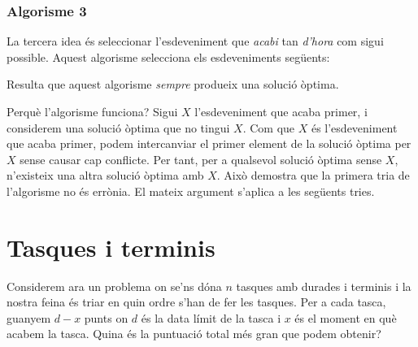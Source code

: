 \subsubsection*{Algorisme 3}

La tercera idea és seleccionar l'esdeveniment que
\emph{acabi} tan \emph{d'hora} com sigui possible.
Aquest algorisme selecciona els esdeveniments següents:
\begin{center}
\end{center}

Resulta que aquest algorisme
\emph{sempre} produeix una solució òptima.

Perquè l'algorisme funciona?  Sigui $X$ l'esdeveniment que acaba
primer, i considerem una solució òptima que no tingui $X$. Com
que $X$ és l'esdeveniment que acaba primer, podem intercanviar
el primer element de la solució òptima per $X$ sense
causar cap conflicte. Per tant, per a qualsevol solució òptima
sense $X$, n'existeix una altra solució òptima amb $X$. Això demostra
que la primera tria de l'algorisme no és errònia. El mateix argument
s'aplica a les següents tries.

\section{Tasques i terminis}

Considerem ara un problema on
se'ns dóna $n$ tasques amb durades i terminis
i la nostra feina és triar en quin ordre s'han de fer les tasques.
Per a cada tasca, guanyem $d-x$ punts
on $d$ és la data límit de la tasca
i $x$ és el moment en què acabem la tasca.
Quina és la puntuació total més gran
que podem obtenir?

